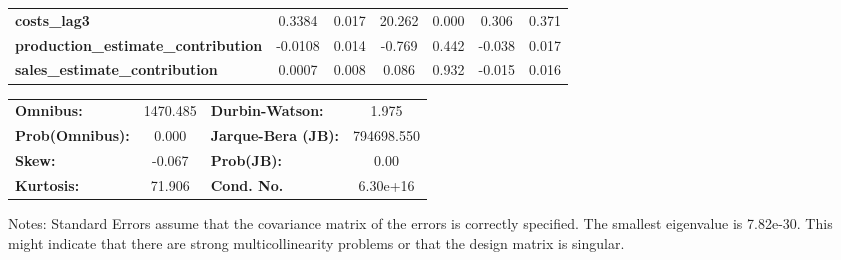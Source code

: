 \begin{center}
\begin{tabular}{lcccccc}
\textbf{costs\_lag3}                        &       0.3384  &        0.017     &    20.262  &         0.000        &        0.306    &        0.371     \\
\textbf{production\_estimate\_contribution} &      -0.0108  &        0.014     &    -0.769  &         0.442        &       -0.038    &        0.017     \\
\textbf{sales\_estimate\_contribution}      &       0.0007  &        0.008     &     0.086  &         0.932        &       -0.015    &        0.016     \\
\bottomrule
\end{tabular}
\begin{tabular}{lclc}
\textbf{Omnibus:}       & 1470.485 & \textbf{  Durbin-Watson:     } &     1.975   \\
\textbf{Prob(Omnibus):} &   0.000  & \textbf{  Jarque-Bera (JB):  } & 794698.550  \\
\textbf{Skew:}          &  -0.067  & \textbf{  Prob(JB):          } &      0.00   \\
\textbf{Kurtosis:}      &  71.906  & \textbf{  Cond. No.          } &  6.30e+16   \\
\bottomrule
\end{tabular}
\end{center}

Notes: \newline
 [1] Standard Errors assume that the covariance matrix of the errors is correctly specified. \newline
 [2] The smallest eigenvalue is 7.82e-30. This might indicate that there are \newline
 strong multicollinearity problems or that the design matrix is singular.